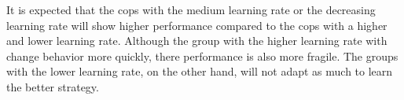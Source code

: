 It is expected that the cops with the medium learning rate or the decreasing learning rate will show higher performance compared to the cops with a higher and lower learning rate. Although the group with the higher learning rate with change behavior more quickly, there performance is also more fragile. The groups with the lower learning rate, on the other hand,  will not adapt as much to learn the better strategy. 

